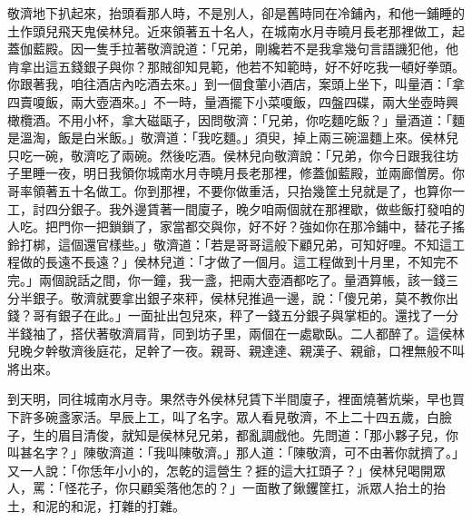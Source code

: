 敬濟地下扒起來，抬頭看那人時，不是別人，卻是舊時同在冷鋪內，和他一鋪睡的土作頭兒飛天鬼侯林兒。近來領著五十名人，在城南水月寺曉月長老那裡做工，起蓋伽藍殿。因一隻手拉著敬濟說道：「兄弟，剛纔若不是我拿幾句言語譏犯他，他肯拿出這五錢銀子與你？那賊卻知見範，他若不知範時，好不好吃我一頓好拳頭。你跟著我，咱往酒店內吃酒去來。」到一個食葷小酒店，案頭上坐下，叫量酒：「拿四賣嗄飯，兩大壺酒來。」不一時，量酒擺下小菜嗄飯，四盤四碟，兩大坐壺時興橄欖酒。不用小杯，拿大磁甌子，因問敬濟：「兄弟，你吃麵吃飯？」量酒道：「麵是溫淘，飯是白米飯。」敬濟道：「我吃麵。」須臾，掉上兩三碗溫麵上來。侯林兒只吃一碗，敬濟吃了兩碗。然後吃酒。侯林兒向敬濟說：「兄弟，你今日跟我往坊子里睡一夜，明日我領你城南水月寺曉月長老那裡，修蓋伽藍殿，並兩廊僧房。你哥率領著五十名做工。你到那裡，不要你做重活，只抬幾筐土兒就是了，也算你一工，討四分銀子。我外邊賃著一間廈子，晚夕咱兩個就在那裡歇，做些飯打發咱的人吃。把門你一把鎖鎖了，家當都交與你，好不好？強如你在那冷鋪中，替花子搖鈴打梆，這個還官樣些。」敬濟道：「若是哥哥這般下顧兄弟，可知好哩。不知這工程做的長遠不長遠？」侯林兒道：「才做了一個月。這工程做到十月里，不知完不完。」兩個說話之間，你一鐘，我一盞，把兩大壺酒都吃了。量酒算帳，該一錢三分半銀子。敬濟就要拿出銀子來秤，侯林兒推過一邊，說：「傻兄弟，莫不教你出錢？哥有銀子在此。」一面扯出包兒來，秤了一錢五分銀子與掌柜的。還找了一分半錢袖了，搭伏著敬濟肩背，同到坊子里，兩個在一處歇臥。二人都醉了。這侯林兒晚夕幹敬濟後庭花，足幹了一夜。親哥、親達達、親漢子、親爺，口裡無般不叫將出來。

到天明，同往城南水月寺。果然寺外侯林兒賃下半間廈子，裡面燒著炕柴，早也買下許多碗盞家活。早辰上工，叫了名字。眾人看見敬濟，不上二十四五歲，白臉子，生的眉目清俊，就知是侯林兒兄弟，都亂調戲他。先問道：「那小夥子兒，你叫甚名字？」陳敬濟道：「我叫陳敬濟。」那人道：「陳敬濟，可不由著你就擠了。」又一人說：「你恁年小小的，怎乾的這營生？捱的這大扛頭子？」侯林兒喝開眾人，罵：「怪花子，你只顧奚落他怎的？」一面散了鍬钁筐扛，派眾人抬土的抬土，和泥的和泥，打雜的打雜。

